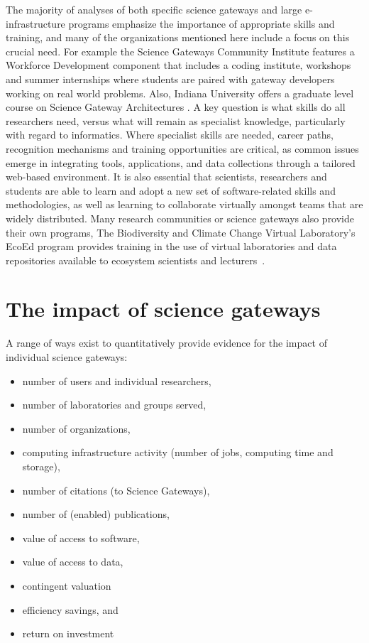 \documentclass[review]{elsarticle}
\begin{document}
The majority of analyses of both specific science gateways and large e-infrastructure programs emphasize the importance of appropriate skills and training, and many of the organizations mentioned here include a focus on this crucial need. 
For example the Science Gateways Community Institute features a Workforce Development component that includes a coding institute, workshops and summer internships where students are paired with gateway developers working on real world problems. Also, Indiana University offers a graduate level course on Science Gateway Architectures \cite{course-86}. 
A key question is what skills do all researchers need, versus what will remain as specialist knowledge, particularly with regard to informatics. Where specialist skills are needed, career paths, recognition mechanisms and training opportunities are critical, as common issues emerge in integrating tools, applications, and data collections through a tailored web-based environment. It is also essential that scientists, researchers and students are able to learn and adopt a new set of software-related skills and methodologies, as well as learning to collaborate virtually amongst teams that are widely distributed. Many research communities or science gateways also provide their own programs, The Biodiversity and Climate Change Virtual Laboratory's EcoEd program provides training in the use of virtual laboratories and data repositories available to ecosystem scientists and lecturers~\cite{ecoed-81}. 

\section{The impact of science gateways}

A range of ways exist to quantitatively provide evidence for the impact of individual science gateways:
\begin{itemize}
	\item number of users and individual researchers,
	\item number of laboratories and groups served,
	\item number of organizations,
	\item computing infrastructure activity (number of jobs, computing time and storage),
	\item number of  citations (to Science Gateways),
	\item number of  (enabled) publications,
	\item value of access to software,
	\item value of access to data,
	\item contingent valuation
	\item efficiency savings, and
	\item return on investment
\end{itemize}
\end{document}
